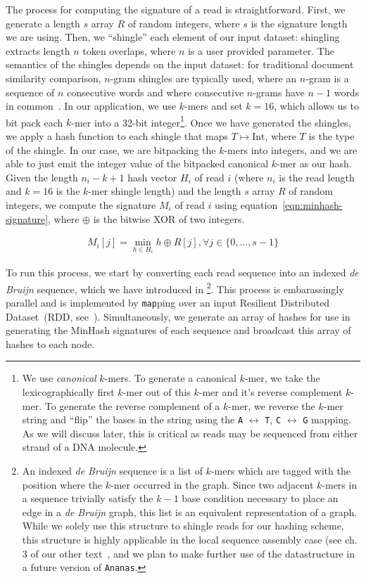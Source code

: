 \documentclass[11pt]{article}
\theoremstyle{plain}
\begin{document}
The process for computing the signature of a read is straightforward. First, we generate
a length $s$ array $R$ of random integers, where $s$ is the signature length we are using.
Then, we ``shingle'' each element of our input dataset: shingling extracts length $n$ token
overlaps, where $n$ is a user provided parameter. The semantics of the shingles depends on
the input dataset: for traditional document similarity comparison, $n$-gram shingles are
typically used, where an $n$-gram is a sequence of $n$ consecutive words and where consecutive
$n$-grams have $n - 1$ words in common~\cite{leskovec14}. In our application, we use $k$-mers
and set $k = 16$, which allows us to bit pack each $k$-mer into a 32-bit integer\footnote{We
use \emph{canonical} $k$-mers. To generate a canonical $k$-mer, we take the lexicographically
first $k$-mer out of this $k$-mer and it's reverse complement $k$-mer. To generate the reverse
complement of a $k$-mer, we reverse the $k$-mer string and ``flip'' the bases in the string
using the \texttt{A} $\leftrightarrow$ \texttt{T}, \texttt{C} $\leftrightarrow$ \texttt{G}
mapping. As we will discuss later, this is critical as reads may be sequenced from either
strand of a DNA molecule.}. Once we have generated the shingles, we apply a hash function
to each shingle that maps $T \mapsto \text{Int}$, where $T$ is the type of the shingle. In
our case, we are bitpacking the $k$-mers into integers, and we are able to just emit the
integer value of the bitpacked canonical $k$-mer as our hash. Given the length $n_i - k + 1$
hash vector $H_i$ of read $i$ (where $n_i$ is the read length and $k = 16$ is the $k$-mer
shingle length) and the length $s$ array $R$ of random integers, we compute the signature
$M_i$ of read $i$ using equation~\eqref{eqn:minhash-signature}, where $\oplus$ is the
bitwise XOR of two integers.

\begin{align}
\label{eqn:minhash-signature}
M_i[j] = \min_{h \in H_i} h \oplus R[j], \forall j \in \{0, \dots, s - 1\}
\end{align}

To run this process, we start by converting each read sequence into an indexed \emph{de Bruijn}
sequence, which we have introduced in \cite{nothaft15thesis}\footnote{An indexed \emph{de Bruijn}
sequence is a list of $k$-mers which are tagged with the position where the $k$-mer occurred in
the graph. Since two adjacent $k$-mers in a sequence trivially satisfy the $k - 1$ base condition
necessary to place an edge in a \emph{de Bruijn} graph, this list is an equivalent representation
of a graph. While we solely use this structure to shingle reads for our hashing scheme, this
structure is highly applicable in the local sequence assembly case (see ch. 3 of our other
text~\cite{nothaft15thesis}, and we plan to make further use of the datastructure in a future
version of \texttt{Ananas}.}. This process is embarassingly parallel and is implemented by
\texttt{map}ping over an input Resilient Distributed Dataset~(RDD, see~\cite{zaharia12}).
Simultaneously, we generate an array of hashes for use in generating the MinHash signatures of
each sequence and broadcast this array of hashes to each node.
\end{document}
